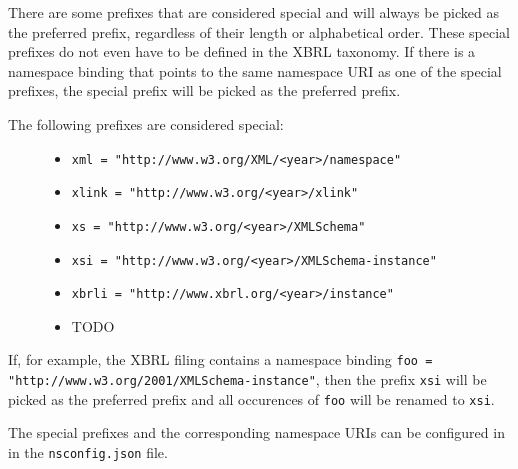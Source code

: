 There are some prefixes that are considered special and will always be picked as the preferred prefix, regardless of their length or alphabetical order.
These special prefixes do not even have to be defined in the XBRL taxonomy. 
If there is a namespace binding that points to the same namespace URI as one of the special prefixes, the special prefix will be picked as the preferred prefix.

The following prefixes are considered special:

\begin{figure}[H]
    \begin{itemize}
        \item \texttt{xml = "http://www.w3.org/XML/<year>/namespace"}
        \item \texttt{xlink = "http://www.w3.org/<year>/xlink"}
        \item \texttt{xs = "http://www.w3.org/<year>/XMLSchema"}
        \item \texttt{xsi = "http://www.w3.org/<year>/XMLSchema-instance"}
        \item \texttt{xbrli = "http://www.xbrl.org/<year>/instance"}
        \item TODO
    \end{itemize}
\end{figure}

If, for example, the XBRL filing contains a namespace binding \texttt{foo = "http://www.w3.org/2001/XMLSchema-instance"},
then the prefix \texttt{xsi} will be picked as the preferred prefix and all occurences of \texttt{foo} will be renamed to \texttt{xsi}.

The special prefixes and the corresponding namespace URIs can be configured in in the \texttt{nsconfig.json} file.